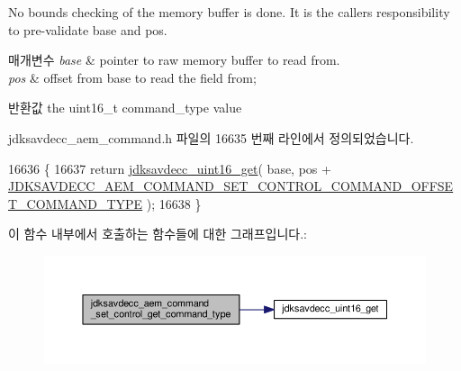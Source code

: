 No bounds checking of the memory buffer is done. It is the caller\textquotesingle{}s responsibility to pre-\/validate base and pos.


\begin{DoxyParams}{매개변수}
{\em base} & pointer to raw memory buffer to read from. \\
\hline
{\em pos} & offset from base to read the field from; \\
\hline
\end{DoxyParams}
\begin{DoxyReturn}{반환값}
the uint16\+\_\+t command\+\_\+type value 
\end{DoxyReturn}


jdksavdecc\+\_\+aem\+\_\+command.\+h 파일의 16635 번째 라인에서 정의되었습니다.


\begin{DoxyCode}
16636 \{
16637     \textcolor{keywordflow}{return} \hyperlink{group__endian_ga3fbbbc20be954aa61e039872965b0dc9}{jdksavdecc\_uint16\_get}( base, pos + 
      \hyperlink{group__command__set__control_gaa0379876489c41e04e084c3fb21b0617}{JDKSAVDECC\_AEM\_COMMAND\_SET\_CONTROL\_COMMAND\_OFFSET\_COMMAND\_TYPE}
       );
16638 \}
\end{DoxyCode}


이 함수 내부에서 호출하는 함수들에 대한 그래프입니다.\+:
\nopagebreak
\begin{figure}[H]
\begin{center}
\leavevmode
\includegraphics[width=350pt]{group__command__set__control_ga8e663c9d7eff45e09c9b1191f2983402_cgraph}
\end{center}
\end{figure}


